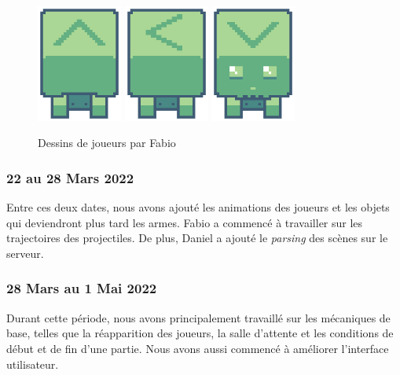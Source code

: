 \documentclass[a4paper]{article}
\begin{document}
\begin{figure}
	\centering
    \includegraphics[width=0.25\textwidth]{images/players/back.png}
    \includegraphics[width=0.25\textwidth]{images/players/side.png}
    \includegraphics[width=0.25\textwidth]{images/players/forward.png}
    \caption{Dessins de joueurs par Fabio}
    \label{fig:players}
\end{figure}

\subsubsection{22 au 28 Mars 2022}
Entre ces deux dates, nous avons ajouté les animations des joueurs et les objets qui deviendront plus tard les armes. Fabio a commencé à travailler sur les trajectoires des projectiles. De plus, Daniel a ajouté le \textit{parsing} des scènes sur le serveur.

\subsubsection{28 Mars au 1 Mai 2022}
Durant cette période, nous avons principalement travaillé sur les mécaniques de base, telles que la réapparition des joueurs, la salle d'attente et les conditions de début et de fin d'une partie. Nous avons aussi commencé à améliorer l'interface utilisateur.
\end{document}
